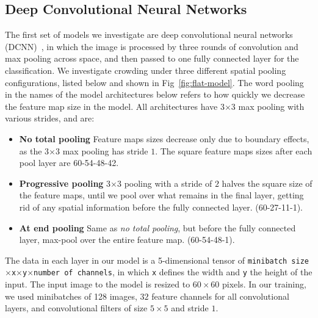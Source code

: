 \documentclass{article}
\begin{document}
\subsection{Deep Convolutional Neural Networks}\label{subsec:DCNN}\vspace{-0.10cm}
The first set of models we investigate are deep convolutional neural networks (DCNN)~\cite{lecun1998gradient}, in which the image is processed by three rounds of convolution and max pooling across space, and then passed to one fully connected layer for the classification. We investigate crowding under three different spatial pooling configurations, listed below and shown in Fig~\ref{fig:flat-model}.  The word pooling in the names of the model architectures below refers to how quickly we decrease the feature map size in the model.  All architectures have 3$\times$3 max pooling with various strides, and are: 
\vspace*{-0.15cm}\begin{itemize}[noitemsep,topsep=0pt,partopsep=0px,leftmargin=*]
\item \textbf{No total pooling} Feature maps sizes decrease only due to boundary effects, as the 3$\times$3 max pooling has stride $1$. The square feature maps sizes after each pool layer are 60-54-48-42.
\item \textbf{Progressive pooling} 3$\times$3 pooling with a stride of $2$ halves the square size of the feature maps, until we pool over what remains in the final layer, getting rid of any spatial information before the fully connected layer. (60-27-11-1).
\item \textbf{At end pooling} Same as \emph{no total pooling}, but before the fully connected layer, max-pool over the entire feature map.  (60-54-48-1).
\end{itemize}

The data in each layer in our model is a 5-dimensional tensor of \texttt{minibatch size}$\times$\texttt{x}$\times$\texttt{y}$\times$\texttt{number of channels}, in which \texttt{x} defines the width and \texttt{y} the height of the input. The input image to the model is resized to $60\times 60$ pixels. In our training, we used minibatches of 128 images, $32$ feature channels for all convolutional layers, and convolutional filters of size $5\times 5$ and stride $1$. 
\end{document}
